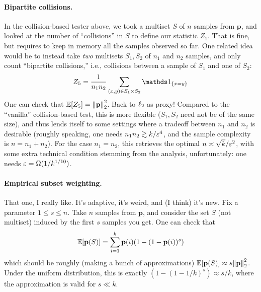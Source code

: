 \documentclass[10pt]{article}
\newcommand{\dst}{\eps}
\newcommand{\ab}{k}
\newcommand{\ns}{n}
\newcommand{\p}{\mathbf{p}}
\begin{document}
\paragraph{Bipartite collisions.} In the collision-based tester above, we took a multiset $S$ of $\ns$ samples from $\p$, and looked at the number of ``collisions'' in $S$ to define our statistic $Z_1$. That is fine, but requires to keep in memory all the samples observed so far. One related idea would be to instead take \emph{two} multisets $S_1,S_2$ of $\ns_1$ and $\ns_2$ samples, and only count ``bipartite collisions,'' i.e., collisions between a sample of $S_1$ and one of $S_2$:
\begin{equation}
    Z_5 = \frac{1}{\ns_1 \ns_2}\sum_{(x,y)\in S_1\times S_2} \indic{x=y}
\end{equation}
One can check that $\expect{Z_5} = \normtwo{\p}^2$. Back to $\lp[2]$ as proxy! Compared to the ``vanilla'' collision-based test, this is more flexible ($S_1,S_2$ need not be of the same size), and thus lends itself to some settings where a tradeoff between $\ns_1$ and $\ns_2$ is desirable (roughly speaking, one needs $\ns_1\ns_2 \gtrsim \ab/\dst^4$, and the sample complexity is $\ns=\ns_1+\ns_2$). For the case $\ns_1=\ns_2$, this retrieves the optimal $\ns \asymp \sqrt{\ab}/\dst^2$, with some extra technical condition stemming from the analysis, unfortunately: one needs $\dst = \Omega(1/\ab^{1/10})$.

\paragraph{Empirical subset weighting.} That one, I really like. It's adaptive, it's weird, and (I think) it's new. Fix a parameter $1\leq s \leq \ns$. Take $\ns$ samples from $\p$, and consider the set $S$ (not multiset) induced by the first $s$ samples you get. One can check that
\begin{equation}
    \expect{\p(S)} = \sum_{i=1}^\ab \p(i) (1-(1-\p(i))^s)
\end{equation}
which should be roughly (making a bunch of approximations) $\expect{\p(S)}\approx s\normtwo{\p}^2$. Under the uniform distribution, this is exactly $(1-(1-1/\ab)^s)\approx s/\ab$, where the approximation is valid for $s\ll \ab$.
\end{document}
